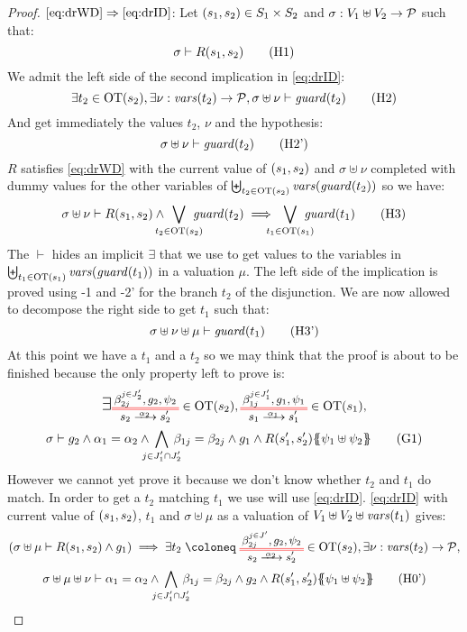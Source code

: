 \documentclass{article}
\begin{document}
\begin{proof}
\item[\(\eqref{eq:drWD}\Rightarrow\eqref{eq:drID}\):]
	Let \({\left(s_1, s_2\right)} \in S_1 \times S_2\) and \(\sigma: V_1 \uplus V_2 \to \mathcal{P}\) such that:
	\[ \sigma \vdash R\mpar{s_1, s_2} \hyp{1} \]
	We admit the left side of the second implication in \eqref{eq:drID}:
	\[ \exists t_2 \in \fOT{s_2}, \exists \nu: \fvars{t_2} \to \values, \sigma \uplus \nu \vdash \fguard{t_2} \hyp{2} \]
	And get immediately the values \(t_2\), \(\nu\) and the hypothesis:
	\[ \sigma \uplus \nu \vdash \fguard{t_2} \hyp{2'} \]
	\(R\) satisfies \eqref{eq:drWD} with the current value of \({\left(s_1, s_2\right)}\) and \(\sigma \uplus \nu\) completed with dummy values for the other variables of \(\biguplus_{t_2 \in \mathrm{OT}{\left(s_2\right)}} \mathit{vars}{\left(\mathit{guard}{\left(t_2\right)}\right)}\) so we have:
	\[ \sigma \uplus \nu \vdash R\mpar{s_1, s_2} \wedge \bigvee_\subbox{t_2 \in \fOT{s_2}} \fguard{t_2} \implies \bigvee_\subbox{t_1 \in \fOT{s_1}} \fguard{t_1} \hyp{3} \]
	The \(\vdash\) hides an implicit \(\exists\) that we use to get values to the variables in \(\biguplus_{t_1 \in \mathrm{OT}{\left(s_1\right)}} \mathit{vars}{\left(\mathit{guard}{\left(t_1\right)}\right)}\) in a valuation \(\mu\).
	The left side of the implication is proved using \hyp{1} and \hyp{2'} for the branch \(t_2\) of the disjunction.
	We are now allowed to decompose the right side to get \(t_1\) such that:
	\[ \sigma \uplus \nu \uplus \mu \vdash \fguard{t_1} \hyp{3'} \]
	At this point we have a \(t_1\) and a \(t_2\) so we may think that the proof is about to be finished because the only property left to prove is:
	\begin{multline}
		\bigsymb{\exists} \OTx{2}{}{2}{2} \in \fOT{s_2}, \OTx{1}{}{1}{1} \in \fOT{s_1}, \\
		\sigma \vdash g_2 \wedge \alpha_1 = \alpha_2 \wedge \bigwedge_\subbox{j \in J'_1 \cap J'_2} \beta_{1j} = \beta_{2j} \wedge g_1 \wedge R\mpar{s'_1, s'_2}\psubst{\psi_1 \uplus \psi_2} \goal{1}
	\end{multline}
	However we cannot yet prove it because we don't know whether \(t_2\) and \(t_1\) do match.
	In order to get a \(t_2\) matching \(t_1\) we use will use \eqref{eq:drID}.
	\eqref{eq:drID} with current value of \({\left(s_1, s_2\right)}\), \(t_1\) and \(\sigma \uplus \mu\) as a valuation of \(V_1 \uplus V_2 \uplus \mathit{vars}{\left(t_1\right)}\) gives:
	\begin{multline}
		\mpar{\sigma \uplus \mu \vdash R\mpar{s_1, s_2} \wedge g_1} \implies \exists t_2 \defobject \OTx{2}{}{2}{} \in \fOT{s_2}, \exists \nu: \fvars{t_2} \to \values, \\
		\sigma \uplus \mu \uplus \nu \vdash \alpha_1 = \alpha_2 \wedge \bigwedge_\subbox{j \in J'_1 \cap J'_2} \beta_{1j} = \beta_{2j} \wedge g_2 \wedge R\mpar{s'_1, s'_2}\psubst{\psi_1 \uplus \psi_2} \hyp{0'}

\end{multline}
\end{proof}
\end{document}
